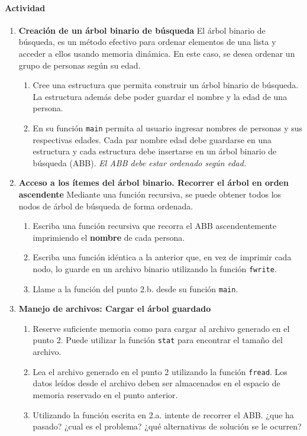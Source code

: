 \documentclass[a4paper,10pt]{article}
\begin{document}
\paragraph{Actividad}
\begin{enumerate}
	\item \textbf{Creación de un árbol binario de búsqueda}
	El árbol binario de búsqueda, es un método efectivo para ordenar elementos de una lista y acceder a ellos usando memoria dinámica.
	En este caso, se desea ordenar un grupo de personas según su edad.

	\begin{enumerate}
		\item Cree una estructura que permita construir un árbol binario de búsqueda. La estructura además debe poder guardar el nombre y la edad de una persona.
		\item En su función \texttt{main} permita al usuario ingresar nombres de personas y sus respectivas edades. Cada par nombre edad debe guardarse en una estructura
			y cada estructura debe insertarse en un árbol binario de búsqueda (ABB). \textit{El ABB debe estar ordenado según edad.}
	\end{enumerate}

	\item \textbf{Acceso a los ítemes del árbol binario. Recorrer el árbol en orden ascendente}
	Mediante una función recursiva, se puede obtener todos los nodos de árbol de búsqueda de forma ordenada.

	\begin{enumerate}
		\item Escriba una función recursiva que recorra el ABB ascendentemente imprimiendo el \textbf{nombre} de cada persona.
		\item Escriba una función idéntica a la anterior que, en vez de imprimir cada nodo, lo guarde en un archivo binario utilizando la función \texttt{fwrite}.
		\item Llame a la función del punto 2.b. desde su función \texttt{main}.
	\end{enumerate}

	\item \textbf{Manejo de archivos: Cargar el árbol guardado}
	
	\begin{enumerate}
		\item Reserve suficiente memoria como para cargar al archivo generado en el punto 2. Puede utilizar la función \texttt{stat} para encontrar el tamaño del archivo.
		\item Lea el archivo generado en el punto 2 utilizando la función \texttt{fread}. Los datos leídos desde el archivo deben ser almacenados en el espacio de memoria reservado en el punto anterior.
		\item Utilizando la función escrita en 2.a. intente de recorrer el ABB. ¿que ha pasado? ¿cual es el problema? ¿qué alternativas de solución se le ocurren?
	\end{enumerate}


\end{enumerate}
\end{document}

